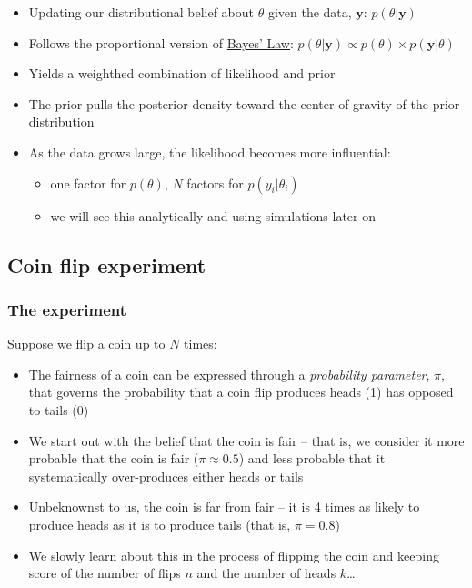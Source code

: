 \documentclass[
  11pt,
]{article}
\providecommand{\tightlist}{%
  \setlength{\itemsep}{0pt}\setlength{\parskip}{0pt}}
\begin{document}
\begin{itemize}
\tightlist
\item
  Updating our distributional belief about \(\theta\) given the data, \(\mathbf{y}\): \(p(\theta | \mathbf{y})\)
\item
  Follows the proportional version of \href{https://en.wikipedia.org/wiki/Bayes\%27_theorem}{Bayes' Law}: \(p(\theta | \mathbf{y}) \propto p(\theta) \times p(\mathbf{y}|\theta)\)
\item
  Yields a weighthed combination of likelihood and prior
\item
  The prior pulls the posterior density toward the center of gravity of the prior distribution
\item
  As the data grows large, the likelihood becomes more influential:

  \begin{itemize}
  \tightlist
  \item
    one factor for \(p(\theta)\), \(N\) factors for \(p(y_i|\theta_i)\)
  \item
    we will see this analytically and using simulations later on
  \end{itemize}
\end{itemize}

\hypertarget{coin-flip-experiment}{%
\subsection{Coin flip experiment}\label{coin-flip-experiment}}

\hypertarget{the-experiment}{%
\subsubsection{The experiment}\label{the-experiment}}

Suppose we flip a coin up to \(N\) times:

\begin{itemize}
\tightlist
\item
  The fairness of a coin can be expressed through a \emph{probability parameter}, \(\pi\), that governs the probability that a coin flip produces heads (1) has opposed to tails (0)
\item
  We start out with the belief that the coin is fair -- that is, we consider it more probable that the coin is fair (\(\pi \approx 0.5\)) and less probable that it systematically over-produces either heads or tails
\item
  Unbeknownst to us, the coin is far from fair -- it is 4 times as likely to produce heads as it is to produce tails (that is, \(\pi=0.8\))
\item
  We slowly learn about this in the process of flipping the coin and keeping score of the number of flips \(n\) and the number of heads \(k\)\ldots{}
\end{itemize}
\end{document}
